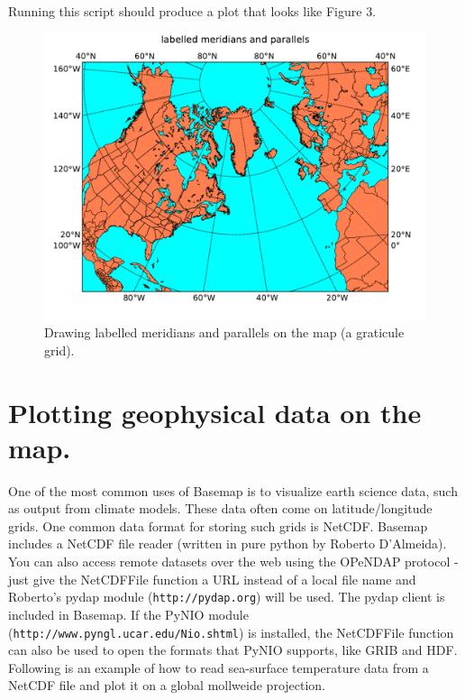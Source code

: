 

Running this script should produce a plot that looks like Figure 3.

\begin{figure}[h]
\includegraphics[scale=0.75]{fig/basemap4}

\caption{Drawing labelled meridians and parallels on the map (a graticule grid).}

\end{figure}


\section{Plotting geophysical data on the map.}

One of the most common uses of Basemap is to visualize earth science
data, such as output from climate models. These data often come on
latitude/longitude grids. One common data format for storing such
grids is NetCDF.  Basemap includes a NetCDF file reader (written in
pure python by Roberto D'Almeida). 
You can also access remote datasets over the web using the OPeNDAP
protocol - just give the NetCDFFile function a URL instead of a local file name
and Roberto's pydap module (\texttt{http://pydap.org}) will be used.
The pydap client is included in Basemap.
If the PyNIO module (\texttt{http://www.pyngl.ucar.edu/Nio.shtml}) is installed, the 
NetCDFFile function can also be used to open the formats that 
PyNIO supports, like GRIB and HDF.
Following is an example
of how to read sea-surface temperature data from a NetCDF file and
plot it on a global mollweide projection.

